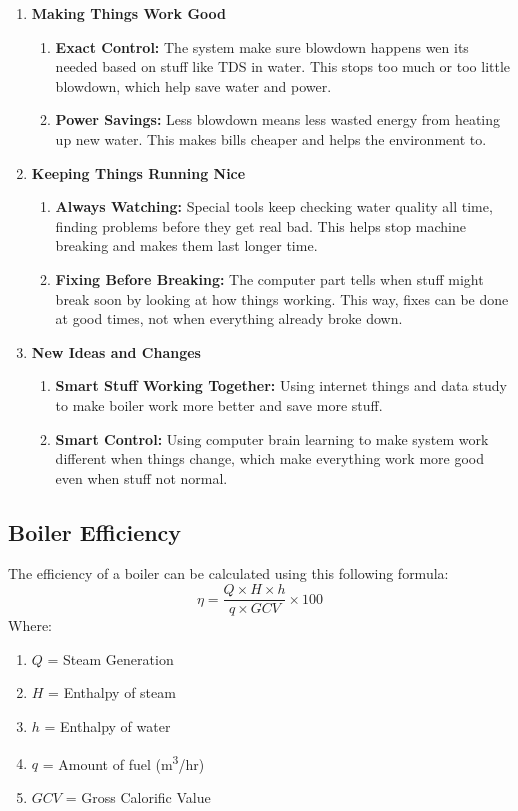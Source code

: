 \begin{enumerate}
\item \textbf{Making Things Work Good}
\begin{enumerate}
    \item \textbf{Exact Control:} The system make sure blowdown happens wen its needed based on stuff like TDS in water. This stops too much or too little blowdown, which help save water and power.
    \item \textbf{Power Savings:} Less blowdown means less wasted energy from heating up new water. This makes bills cheaper and helps the environment to.
\end{enumerate}
\item \textbf{Keeping Things Running Nice}
\begin{enumerate}
    \item \textbf{Always Watching:} Special tools keep checking water quality all time, finding problems before they get real bad. This helps stop machine breaking and makes them last longer time.
    \item \textbf{Fixing Before Breaking:} The computer part tells when stuff might break soon by looking at how things working. This way, fixes can be done at good times, not when everything already broke down.
\end{enumerate}
\item \textbf{New Ideas and Changes}
\begin{enumerate}
    \item \textbf{Smart Stuff Working Together:} Using internet things and data study to make boiler work more better and save more stuff.
    \item \textbf{Smart Control:} Using computer brain learning to make system work different when things change, which make everything work more good even when stuff not normal.
\end{enumerate}
\end{enumerate}

\subsection{Boiler Efficiency}
The efficiency of a boiler can be calculated using this following formula:
\begin{equation}
\eta = \frac{Q \times H \times h}{q \times GCV} \times 100%
\end{equation}
Where:
\begin{enumerate}
\item $Q$ = Steam Generation
\item $H$ = Enthalpy of steam
\item $h$ = Enthalpy of water
\item $q$ = Amount of fuel (m\textsuperscript{3}/hr)
\item $GCV$ = Gross Calorific Value
\end{enumerate}

